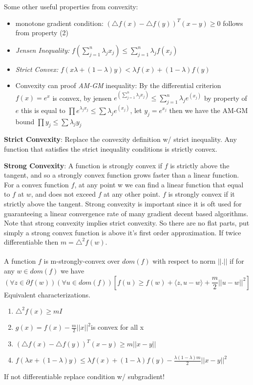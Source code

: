 \documentclass[11pt]{article}
\theoremstyle{quest}
\begin{document}
Some other useful properties from convexity:
\begin{itemize}	
	\item monotone gradient condition: $(\triangle f(x)-\triangle f(y))^T(x-y)\ge 0$ follows from property (2)
	\item \textit{Jensen Inequality:} $f(\sum_{j=1}^n \lambda_j x_j)\le \sum_{j=1}^n \lambda_j f(x_j)$
	\item  \textit{Strict Convex:} $f(x\lambda +(1-\lambda)y)< \lambda f(x)+(1-\lambda)f(y)$
	\item Convexity can proof  \textit{AM-GM} inequality: By the differential criterion $f(x)=e^x$ is convex, by jensen $e^{(\sum_{j=1}^n \lambda_j x_j)}\le \sum_{j=1}^n \lambda_j e^{(x_j)}$ by property of $e$ this is equal to  $ \prod e^{\lambda_j x_j}\le \sum \lambda_j e^{(x_j)}$, let $y_j = e^{x_j}$ then we have the AM-GM bound $\prod y_j\le \sum \lambda_j y_j$
\end{itemize}

\begin{flushleft}\textbf{Strict Convexity}: Replace the convexity definition w/ strict inequality. Any function that satisfies the strict inequality conditions is strictly convex.\end{flushleft} 
\textbf{Strong Convexity}: A function is strongly convex if $f$ is strictly above the tangent, and so a strongly convex function grows faster than a linear function. For a convex function $f$, at any point w we can find a linear function that equal to $f$ at $w$, and does not exceed $f$ at any other point. $f$ is strongly convex if it strictly above the tangent. Strong convexity is important since it is oft used  for guaranteeing a linear convergence rate of many gradient decent based algorithms. Note that strong convexity implies strict convexity. So there are no flat parts, put simply a strong convex function is above it's first order approximation. If twice differentiable then $m=\triangle^2f(w)$.  \\ \\ 
 A function $f$ is m-strongly-convex over $dom(f)$ with respect to norm $||.||$ if for any $w\in dom(f)$ we have
$$(\forall z \in \partial f(w))(\forall u\in dom(f))[f(u)\ge f(w)+\langle z,u-w \rangle+\frac{m}{2}||u-w||^2]$$ 
Equivalent characterizations. 
\begin{enumerate}
	\item $\triangle^2 f(x) \ge mI$
	\item $g(x)=f(x)-\frac{m}{2}||x||^2 $is convex for all x
	\item $(\triangle f(x)-\triangle f(y))^T (x-y)\ge m ||x-y||$
	\item $ f(\lambda x + (1-\lambda) y)\le \lambda f(x)+(1-\lambda)f(y)-\frac{\lambda(1-\lambda)m}{2}||x-y||^2$
\end{enumerate}
 If not differentiable replace condition w/ subgradient!
\end{document}
